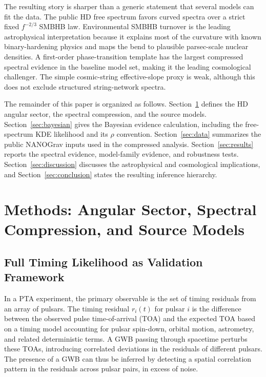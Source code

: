 \documentclass[symmetry,article,submit,pdftex,moreauthors]{Definitions/mdpi}
\begin{document}
The resulting story is sharper than a generic statement that several models can fit the data. The public HD free spectrum favors curved spectra over a strict fixed $f^{-2/3}$ SMBHB law. Environmental SMBHB turnover is the leading astrophysical interpretation because it explains most of the curvature with known binary-hardening physics and maps the bend to plausible parsec-scale nuclear densities. A first-order phase-transition template has the largest compressed spectral evidence in the baseline model set, making it the leading cosmological challenger. The simple cosmic-string effective-slope proxy is weak, although this does not exclude structured string-network spectra.

The remainder of this paper is organized as follows. Section~\ref{sec:methods} defines the HD angular sector, the spectral compression, and the source models. Section~\ref{sec:bayesian} gives the Bayesian evidence calculation, including the free-spectrum KDE likelihood and its $\rho$ convention. Section~\ref{sec:data} summarizes the public NANOGrav inputs used in the compressed analysis. Section~\ref{sec:results} reports the spectral evidence, model-family evidence, and robustness tests. Section~\ref{sec:discussion} discusses the astrophysical and cosmological implications, and Section~\ref{sec:conclusion} states the resulting inference hierarchy.

\section{Methods: Angular Sector, Spectral Compression, and Source Models}\label{sec:methods}
\subsection{Full Timing Likelihood as Validation Framework}
In a PTA experiment, the primary observable is the set of timing residuals from an array of pulsars. The timing residual $r_i(t)$ for pulsar $i$ is the difference between the observed pulse time-of-arrival (TOA) and the expected TOA based on a timing model accounting for pulsar spin-down, orbital motion, astrometry, and related deterministic terms. A GWB passing through spacetime perturbs these TOAs, introducing correlated deviations in the residuals of different pulsars. The presence of a GWB can thus be inferred by detecting a spatial correlation pattern in the residuals across pulsar pairs, in excess of noise.
\end{document}
